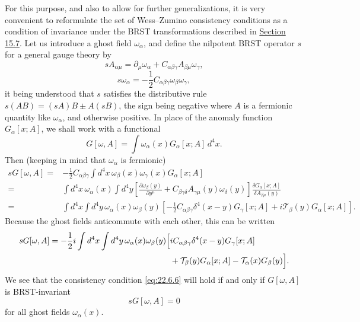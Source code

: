 For this purpose, and also to allow for further generalizations, it is very
convenient to reformulate the set of Wess--Zumino consistency conditions
as a condition of invariance under the BRST transformations described in
\hyperref[sec:15.7]{Section 15.7}. Let us introduce a ghost field
$\omega_\alpha$, and define the nilpotent BRST operator $s$ for a general
gauge theory by
\begin{equation}
 sA_{\alpha\mu}
 =\partial_\mu\omega_\alpha
 +C_{\alpha\beta\gamma}A_{\beta\mu}\omega_\gamma,
 \tag{22.6.7}\label{eq:22.6.7}
\end{equation}
\begin{equation}
 s\omega_\alpha
 =-\frac12 C_{\alpha\beta\gamma}\omega_\beta\omega_\gamma,
 \tag{22.6.8}\label{eq:22.6.8}
\end{equation}
it being understood that $s$ satisfies the distributive rule
$s(AB)=(sA)B\pm A(sB)$, the sign being negative where $A$ is a fermionic
quantity like $\omega_\alpha$, and otherwise positive. In place of the
anomaly function $G_\alpha[x;A]$, we shall work with a functional
\begin{equation}
 G[\omega,A]
 =\int\omega_\alpha(x)G_\alpha[x;A]\,d^4x.
 \tag{22.6.9}\label{eq:22.6.9}
\end{equation}
Then (keeping in mind that $\omega_\alpha$ is fermionic)
\begin{align*}
 sG[\omega,A]
 ={}&-\frac12 C_{\alpha\beta\gamma}
 \int d^4x\,\omega_\beta(x)\omega_\gamma(x)G_\alpha[x;A]
 \\
 ={}&\int d^4x\,\omega_\alpha(x)\int d^4y
 \left[
 \frac{\partial\omega_\beta(y)}{\partial y^\mu}
 +C_{\beta\gamma\delta}A_{\gamma\mu}(y)\omega_\delta(y)
 \right]
 \frac{\delta G_\alpha[x;A]}{\delta A_{\beta\mu}(y)}
 \\
 ={}&\int d^4x\int d^4y\,\omega_\alpha(x)\omega_\beta(y)
 \left[
 -\frac12 C_{\alpha\beta\gamma}\delta^4(x-y)G_\gamma[x;A]
 +i\mathcal T_\beta(y)G_\alpha[x;A]
 \right].
\end{align*}
Because the ghost fields anticommute with each other, this can be written
\[
 \begin{aligned}
 sG[\omega,A]
 =-\frac12 i\int d^4x\int d^4y\,
 \omega_\alpha(x)\omega_\beta(y)
 \Bigl[
 &iC_{\alpha\beta\gamma}\delta^4(x-y)G_\gamma[x;A]
 \\
 &+\mathcal T_\beta(y)G_\alpha[x;A]
 -\mathcal T_\alpha(x)G_\beta(y)
 \Bigr].
 \end{aligned}
\]
We see that the consistency condition \eqref{eq:22.6.6} will hold if and
only if $G[\omega,A]$ is BRST-invariant
\begin{equation}
 sG[\omega,A]=0
 \tag{22.6.10}\label{eq:22.6.10}
\end{equation}
for all ghost fields $\omega_\alpha(x)$.

